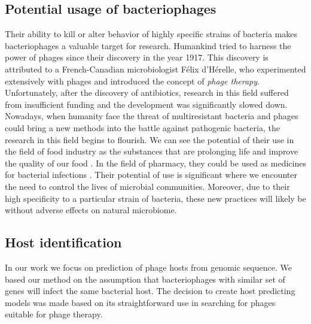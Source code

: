 \subsection{Potential usage of bacteriophages}
Their ability to kill or alter behavior of highly specific strains of bacteria makes bacteriophages a valuable target for research.
Humankind tried to harness the power of phages since their discovery in the year 1917.
This discovery is attributed to a French-Canadian microbiologist Félix d'Hérelle, who experimented extensively with phages and introduced the concept of \emph{phage therapy}\cite{phages_in_nature}.
Unfortunately, after the discovery of antibiotics, research in this field suffered from insufficient funding and the development was significantly slowed down.\\
Nowadays, when humanity face the threat of multiresistant bacteria and phages could bring a new methods into the battle against pathogenic bacteria, the research in this field begins to flourish.
We can see the potential of their use in the field of food industry as the substances that are prolonging life and improve the quality of our food \cite{}.
In the field of pharmacy, they could be used as medicines for bacterial infections \cite{}.
Their potential of use is significant where we encounter the need to control the lives of microbial communities.
Moreover, due to their high specificity to a particular strain of bacteria, these new practices will likely be without adverse effects on natural microbiome.


\subsection{Host identification}
In our work we focus on prediction of phage hosts from genomic sequence.
We based our method on the assumption that bacteriophages with similar set of genes will infect the same bacterial host.
The decision to create host predicting models was made based on its straightforward use in searching for phages suitable for phage therapy.

